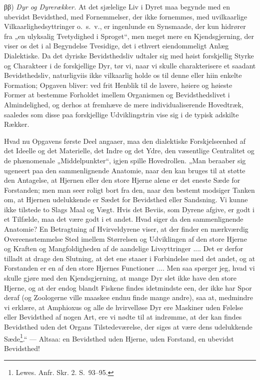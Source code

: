 \documentclass[11pt]{book}
\newcommand{\opage}[1]{\marginnote{\footnotesize\textit{[#1]}}}
\begin{document}
ββ) \emph{Dyr og Dyrerækker.} At det sjælelige Liv i Dyret maa begynde
med en ubevidst Bevidsthed, med Fornemmelser, der ikke fornemmes, med
uvilkaarlige Vilkaarlighedsyttringer o.~s.~v., er ingenlunde en
Synsmaade, der kun hidrører fra „en ulyksalig Tvetydighed i Sproget“,
men meget mere en Kjendsgjerning, der viser os det i al Begyndelse
Tvesidige, det i ethvert eiendommeligt Anlæg Dialektiske. Da det
dyriske Bevidsthedsliv udtaler sig med høist forskjellig Styrke og
Charakteer i de forskjellige Dyr, tør vi, naar vi skulle
charakterisere et saadant Bevidsthedsliv, naturligviis ikke vilkaarlig
holde os til denne eller hiin enkelte Formation; Opgaven bliver: ved
frit Henblik til de lavere, høiere og høieste Former at bestemme
Forholdet imellem Organismen og Bevidsthedslivet i Almindelighed, og
derhos at fremhæve de mere individualiserende Hovedtræk, saaledes som
disse paa forskjellige Udviklingstrin vise sig i de typisk adskilte
Rækker.

Hvad nu Opgavens første Deel angaaer, maa den dialektiske
Forskjelseenhed af det Ideelle og det Materielle, det Indre og det
Ydre, den væsentlige Centralitet og de phænomenale „Middelpunkter“,
igjen spille Hovedrollen. „Man beraaber sig ugeneert paa den
sammenlignende Anatomie, naar den kan bruges til at støtte den
Antagelse, at Hjernen eller den store Hjerne alene er det eneste Sæde
for Forstanden; men man seer roligt bort fra den, naar den bestemt
modsiger Tanken om, at Hjernen udelukkende er Sædet for Bevidsthed
eller Sandsning. Vi kunne ikke tilstede to Slags Maal og Vægt.
\opage{363} \setcounter{footnote}{0}%
Hvis det Beviis, som Dyrene afgive, er godt i et Tilfælde, maa det
være godt i et andet. Hvad siger da den sammenlignende Anatomie? En
Betragtning af Hvirveldyrene viser, at der finder en mærkværdig
Overeensstemmelse Sted imellem Størrelsen og Udviklingen af den store
Hjerne og Kraften og Mangfoldigheden af de aandelige Livsyttringer
.... Det er derfor tilladt at drage den Slutning, at det ene staaer i
Forbindelse med det andet, og at Forstanden er en af den store Hjernes
Functioner .... Men saa spørger jeg, hvad vi skulle gjøre med den
Kjendsgjerning, at mange Dyr slet ikke have den store Hjerne, og at
der endog blandt Fiskene findes idetmindste een, der ikke har Spor
deraf (og Zoologerne ville maaskee endnu finde mange andre), saa at,
medmindre vi erklære, at Amphioxus og alle de hvirvelløse Dyr ere
Maskiner uden Følelse eller Bevidsthed af nogen Art, ere vi nødte til
at indrømme, at der kan findes Bevidsthed uden det Organs
Tilstedeværelse, der siges at være dens udelukkende
Sæde\footnote{%
Lewes. Anfr. Skr. 2. S.~93--95.
}.“ --- Altsaa: en Bevidsthed uden Hjerne, uden Forstand, en ubevidst
Bevidsthed!
\end{document}
